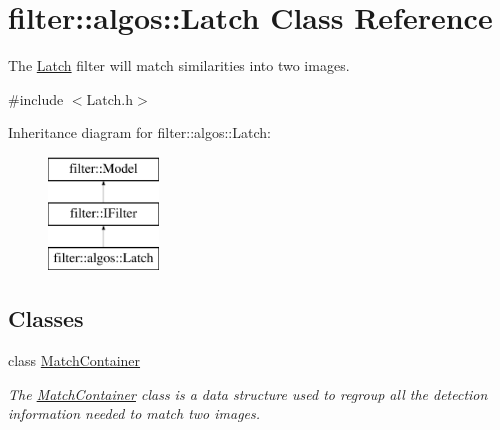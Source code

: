 \hypertarget{classfilter_1_1algos_1_1_latch}{}\section{filter\+:\+:algos\+:\+:Latch Class Reference}
\label{classfilter_1_1algos_1_1_latch}


The \hyperlink{classfilter_1_1algos_1_1_latch}{Latch} filter will match similarities into two images.  




{\ttfamily \#include $<$Latch.\+h$>$}

Inheritance diagram for filter\+:\+:algos\+:\+:Latch\+:\begin{figure}[H]
\begin{center}
\leavevmode
\includegraphics[height=3.000000cm]{de/d27/classfilter_1_1algos_1_1_latch}
\end{center}
\end{figure}
\subsection*{Classes}
\begin{DoxyCompactItemize}
\item 
class \hyperlink{classfilter_1_1algos_1_1_latch_1_1_match_container}{Match\+Container}
\begin{DoxyCompactList}\small\item\em The \hyperlink{classfilter_1_1algos_1_1_latch_1_1_match_container}{Match\+Container} class is a data structure used to regroup all the detection information needed to match two images. \end{DoxyCompactList}\end{DoxyCompactItemize}
